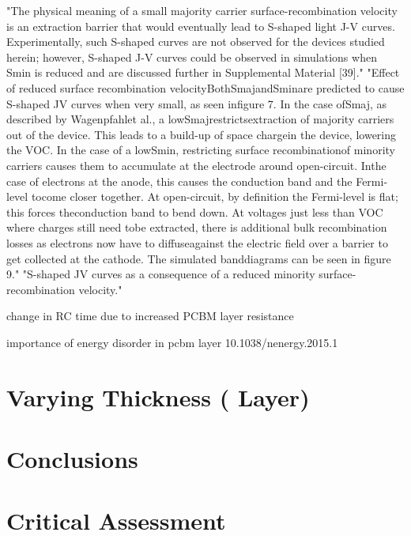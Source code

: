 "The physical meaning of a small majority carrier surface-recombination velocity is an extraction barrier that would eventually lead to S-shaped light J-V curves. Experimentally, such S-shaped curves are not observed for the devices studied herein; however, S-shaped J-V curves could be observed in simulations when Smin is reduced and are discussed further in Supplemental Material [39]."
"Effect of reduced surface recombination velocityBothSmajandSminare predicted to cause S-shaped JV curves when very small, as seen infigure 7.  In the case ofSmaj,  as described by Wagenpfahlet al.,  a lowSmajrestrictsextraction of majority carriers out of the device.  This leads to a build-up of space chargein the device, lowering the VOC.  In the case of a lowSmin, restricting surface recombinationof  minority  carriers  causes  them  to  accumulate  at  the  electrode  around  open-circuit.   Inthe case of electrons at the anode, this causes the conduction band and the Fermi-level tocome closer together.  At open-circuit, by definition the Fermi-level is flat;  this forces theconduction band to bend down.  At voltages just less than VOC where charges still need tobe extracted, there is additional bulk recombination losses as electrons now have to diffuseagainst the electric field over a barrier to get collected at the cathode.  The simulated banddiagrams can be seen in figure 9."
"S-shaped JV curves as a consequence of a reduced minority surface-recombination velocity." \cite{Wheeler2015}

change in RC time due to increased PCBM layer resistance \cite{Wheeler2017}

importance of energy disorder in pcbm layer 10.1038/nenergy.2015.1

\section{Varying  Thickness ( Layer)}
\section{Conclusions}
\section{Critical Assessment}